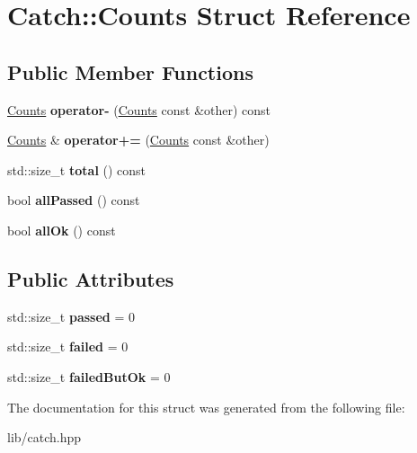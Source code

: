 \hypertarget{struct_catch_1_1_counts}{}\section{Catch\+:\+:Counts Struct Reference}
\label{struct_catch_1_1_counts}
\subsection*{Public Member Functions}
\begin{DoxyCompactItemize}
\item 
\mbox{\label{struct_catch_1_1_counts_aaa10666f559057e3e860d2a5a6fae4c4}} 
\mbox{\hyperlink{struct_catch_1_1_counts}{Counts}} {\bfseries operator-\/} (\mbox{\hyperlink{struct_catch_1_1_counts}{Counts}} const \&other) const
\item 
\mbox{\label{struct_catch_1_1_counts_a322a89475cd2cc039140ef371e973677}} 
\mbox{\hyperlink{struct_catch_1_1_counts}{Counts}} \& {\bfseries operator+=} (\mbox{\hyperlink{struct_catch_1_1_counts}{Counts}} const \&other)
\item 
\mbox{\label{struct_catch_1_1_counts_a94f969c09cf52d1339c085c9603cd1d3}} 
std\+::size\+\_\+t {\bfseries total} () const
\item 
\mbox{\label{struct_catch_1_1_counts_a84999490e0ecaa3de5e121bf48eda1b3}} 
bool {\bfseries all\+Passed} () const
\item 
\mbox{\label{struct_catch_1_1_counts_a33bd996e016030155b99fe1c51c08991}} 
bool {\bfseries all\+Ok} () const
\end{DoxyCompactItemize}
\subsection*{Public Attributes}
\begin{DoxyCompactItemize}
\item 
\mbox{\label{struct_catch_1_1_counts_ad28daaf3de28006400208b6dd0c631e6}} 
std\+::size\+\_\+t {\bfseries passed} = 0
\item 
\mbox{\label{struct_catch_1_1_counts_a19982a3817a3bc2c07f0290e71f497a3}} 
std\+::size\+\_\+t {\bfseries failed} = 0
\item 
\mbox{\label{struct_catch_1_1_counts_ac090973a2ff51394cd452718e75c073e}} 
std\+::size\+\_\+t {\bfseries failed\+But\+Ok} = 0
\end{DoxyCompactItemize}


The documentation for this struct was generated from the following file\+:\begin{DoxyCompactItemize}
\item 
lib/catch.\+hpp\end{DoxyCompactItemize}
